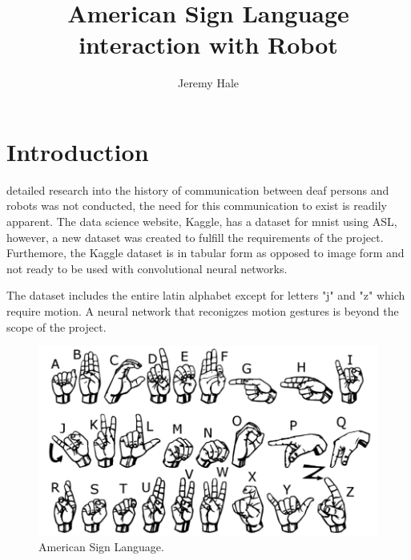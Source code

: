 \documentclass[10pt,journal,compsoc]{IEEEtran}
\begin{document}
\title{American Sign Language interaction with Robot}

\author{Jeremy Hale}

%
{}


\maketitle
\IEEEdisplaynontitleabstractindextext
\IEEEpeerreviewmaketitle
\section{Introduction}
\label{sec:introduction}

 detailed research into the history of communication between deaf persons and robots was not conducted, the need for this communication to exist is readily apparent. The data science website, Kaggle, has a dataset for mnist using ASL\cite{kaggle:mnist_asl}, however, a new dataset was created to fulfill the requirements of the project. Furthemore, the Kaggle dataset is in tabular form as opposed to image form and not ready to be used with convolutional neural networks.

The dataset includes the entire latin alphabet except for letters "j" and "z" which require motion. A neural network that reconigzes motion gestures is beyond the scope of the project.

\begin{figure}[thpb]
      \centering
      \includegraphics[width=\linewidth]{american_sign_language}
      \caption{American Sign Language.\cite{kaggle:mnist_asl}}
      \label{fig:asl}
\end{figure}
\end{document}
